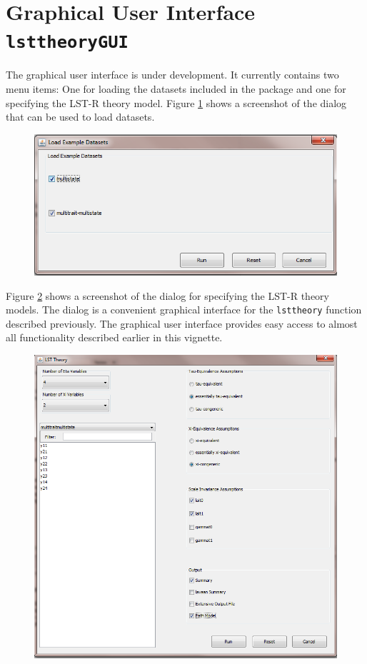 \documentclass[10pt]{article}\usepackage{graphicx, color}
\begin{document}
\newpage

\section{Graphical User Interface \texttt{lsttheoryGUI}}

The graphical user interface is under development. It currently contains two menu items: One for loading the datasets included in the package and one for specifying the LST-R theory model. Figure \ref{fig:loaddata} shows a screenshot of the dialog that can be used to load datasets. 

\begin{figure}
  \includegraphics[scale=0.5]{loaddata.png}
  \label{fig:loaddata}
\end{figure}


Figure \ref{fig:lsttheory} shows a screenshot of the dialog for specifying the LST-R theory models. The dialog is a convenient graphical interface for the \texttt{lsttheory} function described previously. The graphical user interface provides easy access to almost all functionality described earlier in this vignette.


\begin{figure}
  \includegraphics[scale=0.5]{lsttheory.png}
  \label{fig:lsttheory}
\end{figure}
\end{document}
